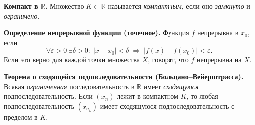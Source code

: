 
\textbf{Компакт в $\mathbb{R}$.}
Множество $K\subset\mathbb{R}$ называется \emph{компактным}, если оно \emph{замкнуто} и \emph{ограничено}.

\medskip

\textbf{Определение непрерывной функции (точечное).}
Функция $f$ непрерывна в $x_0$, если
\[
\forall \varepsilon>0\;\exists \delta>0:\;
|x-x_0|<\delta \;\Longrightarrow\;
|f(x)-f(x_0)|<\varepsilon.
\]
Если это верно для каждой точки множества $X$, говорят, что $f$ непрерывна на $X$.

\medskip

\textbf{Теорема о сходящейся подпоследовательности (Больцано--Вейерштрасса).}
Всякая \emph{ограниченная} последовательность в $\mathbb{R}$ имеет \emph{сходящуюся} подпоследовательность.  
Если $(x_n)$ лежит в компактном $K$, то любая подпоследовательность $(x_{n_k})$ имеет сходящуюся подпоследовательность с пределом в $K$.  
